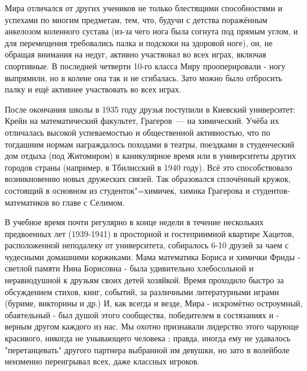 Мира отличался от других учеников не только блестящими способностями и успехами по многим предметам, тем, что, будучи с детства поражённым анкелозом коленного сустава (из-за чего нога была согнута под прямым углом, и для перемещения требовались палка и подскоки на здоровой ноге), он, не обращая внимания на недуг, активно участвовал во всех играх, включая спортивные. В последней четверти 10-го класса Миру прооперировали - ногу выпрямили, но в колене она так и не сгибалась. Зато можно было отбросить палку и ещё активнее участвовать во всех играх.

После окончания школы в 1935 году друзья поступили в Киевский университет:
Крейн на математический факультет, Грагеров~--- на химический.
Учёба их отличалась высокой успеваемостью и общественной активностью,
что по тогдашним нормам награждалось походами в театры, поездками в студенческий дом отдыха (под Житомиром)
в каникулярное время или в университеты других городов страны (например, в Тбилисский в 1940 году).
Всё это способствовало возникновению новых дружеских связей.
Так образовался сплочённый кружок, состоящий в основном из сту\-де\-н\-ток"=хи\-ми\-чек,
химика Грагерова и студентов-математиков во главе с Селимом.

В учебное время почти регулярно в конце недели в течение нескольких предвоенных лет (1939-1941) в просторной и гостеприимной квартире Хацетов, расположенной неподалеку от университета, собиралось 6-10 друзей за чаем с чудесными домашними коржиками. Мама математика Бориса и химички Фриды - светлой памяти Нина Борисовна - была удивительно хлебосольной и неравнодушной к друзьям своих детей хозяйкой. Время проходило быстро за обсуждением стихов, книг, событий, за различными литературными играми (буриме, викторины и др.) И, как всегда и везде, Мира - искромётно остроумный, обаятельный - был душой этого сообщества, победителем в состязаниях и - верным другом каждого из нас. Мы охотно признавали лидерство этого чарующе красивого, никогда не унывающего человека ; правда, иногда ему не удавалось "перетанцевать" другого партнера выбранной им девушки, но зато в волейболе неизменно переигрывал всех, даже классных игроков.

